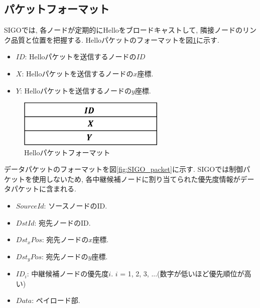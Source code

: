 \documentclass[10pt]{jreport}
\begin{document}
\subsection{パケットフォーマット}

SIGOでは, 各ノードが定期的にHelloをブロードキャストして, 隣接ノードのリンク品質と位置を把握する. Helloパケットのフォーマットを図\ref{fig:hello_packet}に示す.

\begin{itemize}
	\item $ID$: Helloパケットを送信するノードの$ID$
	\item $X$: Helloパケットを送信するノードの$x$座標.
	\item $Y$: Helloパケットを送信するノードの$y$座標.
\end{itemize}


\begin{figure}[!ht]
	\centering
	\includegraphics[width=70mm]{figures/hello_packet_format.eps}
	\caption{Helloパケットフォーマット}
	\label{fig:hello_packet}
\end{figure}

データパケットのフォーマットを図\ref{fig:SIGO_packet}に示す. SIGOでは制御パケットを使用しないため, 各中継候補ノードに割り当てられた優先度情報がデータパケットに含まれる.

\begin{itemize}
	\item $SourceId$: ソースノードのID.
	\item $DstId$: 宛先ノードのID.
	\item $Dst_x Pos$: 宛先ノードの$x$座標.
	\item $Dst_y Pos$: 宛先ノードの$y$座標.
	\item $ID_i$: 中継候補ノードの優先度$i$. $i$ = 1, 2, 3, ...(数字が低いほど優先順位が高い) 
	\item $Data$: ペイロード部.
\end{itemize}
\end{document}
